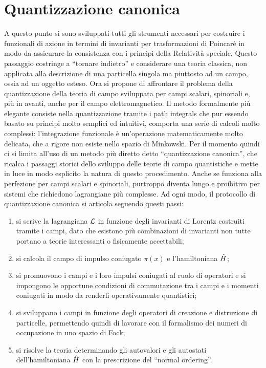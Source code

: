 \chapter{Quantizzazione canonica}
A questo punto si sono sviluppati tutti gli strumenti necessari per costruire i funzionali di azione in termini di invarianti per trasformazioni di Poincarè in modo da assicurare la consistenza con i principi della Relatività speciale. Questo passaggio costringe a ``tornare indietro'' e considerare una teoria classica, non applicata alla descrizione di una particella singola ma piuttosto ad un campo, ossia ad un oggetto esteso. Ora si propone di affrontare il problema della quantizzazione della teoria di campo sviluppata per campi scalari, spinoriali e, più in avanti, anche per il campo elettromagnetico. Il metodo formalmente più elegante consiste nella quantizzazione tramite i path integrals che pur essendo basato su principi molto semplici ed intuitivi, comporta una serie di calcoli molto complessi: l'integrazione funzionale è un'operazione matematicamente molto delicata, che a rigore non esiste nello spazio di Minkowski. Per il momento quindi ci si limita all'uso di un metodo più diretto detto ``quantizzazione canonica'', che ricalca i passaggi storici dello sviluppo delle teorie di campo quantistiche e mette in luce in modo esplicito la natura di questo procedimento. Anche se funziona alla perfezione per campi scalari e spinoriali, purtroppo diventa lungo e proibitivo per sistemi che richiedono lagrangiane più complesse. Ad ogni modo, il protocollo di quantizzazione canonica si articola seguendo questi passi:
\begin{enumerate}
    \item si scrive la lagrangiana $\mathcal{L}$ in funzione degli invarianti di Lorentz costruiti tramite i campi, dato che esistono più combinazioni di invarianti non tutte portano a teorie interessanti o fisicamente accettabili;
    \item si calcola il campo di impulso coniugato $\pi(x)$ e l'hamiltoniana $\hat{H}$;
    \item si promuovono i campi e i loro impulsi coniugati al ruolo di operatori e si impongono le opportune condizioni di commutazione tra i campi e i momenti coniugati in modo da renderli operativamente quantistici;
    \item si sviluppano i campi in funzione degli operatori di creazione e distruzione di particelle, permettendo quindi di lavorare con il formalismo dei numeri di occupazione in uno spazio di Fock;
    \item si risolve la teoria determinando gli autovalori e gli autostati dell'hamiltoniana $\hat{H}$ con la prescrizione del ``normal ordering''.
\end{enumerate}

